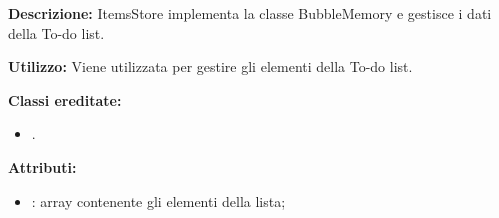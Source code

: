 \subparagraph[::ItemsStore]{\class}\mbox{}\\ \label{\class}
\textbf{Descrizione:}
ItemsStore implementa la classe BubbleMemory e gestisce i dati della To-do list.

\textbf{Utilizzo:}
Viene utilizzata per gestire gli elementi della To-do list.

\textbf{Classi ereditate:}
\begin{itemize}
	\item {}.
\end{itemize}

\textbf{Attributi:}
\begin{itemize}
	\item {}: array contenente gli elementi della lista;
\end{itemize}

